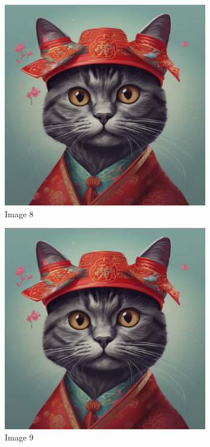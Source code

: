 \documentclass{article}%
\begin{document}
\begin{figure}[h!]%
\centering%
\includegraphics[width=0.8\textwidth]{source/image1.png}%
\caption{Image 8}%
\end{figure}

%


\begin{figure}[h!]%
\centering%
\includegraphics[width=0.8\textwidth]{source/image1.png}%
\caption{Image 9}%
\end{figure}

%
\end{document}
